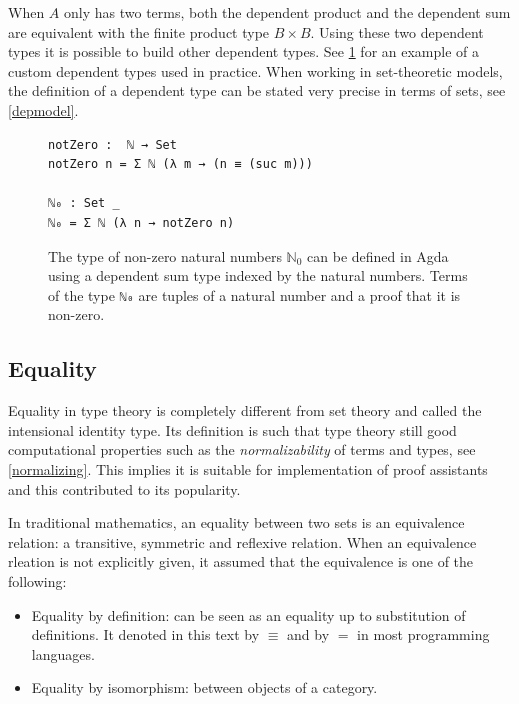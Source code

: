 \documentclass[12pt,a4paper,twoside,xetex]{book}
\newcommand{\keyword}[1]{\emph{#1}\index{#1}}
\begin{document}



When $A$ only has two terms, both the dependent product and the dependent sum 
are equivalent with the finite product type $B \times B$. Using these two 
dependent types it is possible to build other dependent types. See 
\cref{non-zeroNats} for an example of a custom dependent types used in practice. 
When working in set-theoretic models, the definition of a dependent type can be 
stated very precise in terms of sets, see \cref{depmodel}.

\begin{figure}\label{non-zeroNats}
\centering
\begin{BVerbatim}
notZero :  ℕ → Set
notZero n = Σ ℕ (λ m → (n ≡ (suc m)))

ℕ₀ : Set _
ℕ₀ = Σ ℕ (λ n → notZero n)
\end{BVerbatim}
\caption{The type of non-zero natural numbers $\mathbb{N}_0$ can be defined in 
Agda using a dependent sum type indexed by the natural numbers. Terms of the 
type \texttt{ℕ₀} are tuples of a natural number and a proof that it is 
non-zero.}
\end{figure}


\subsection{Equality}


Equality in type theory is completely different from set theory and called the intensional identity type. Its definition is such that type theory still good computational properties such as the \keyword{normalizability} of terms and types, see \cref{normalizing}. This implies it is suitable for implementation of proof assistants and this contributed to its popularity. 

In traditional mathematics, an equality between two sets is an equivalence relation: a transitive, symmetric and reflexive relation. When an equivalence rleation is not explicitly given, it assumed that the equivalence is one of the following: 

\begin{itemize}
 \item Equality by definition: can be seen as an equality up to substitution 
of definitions. It denoted in this text by $\equiv$ and by $=$ in most programming languages.
 \item Equality by isomorphism: between objects of a category.
\end{itemize}
\end{document}
